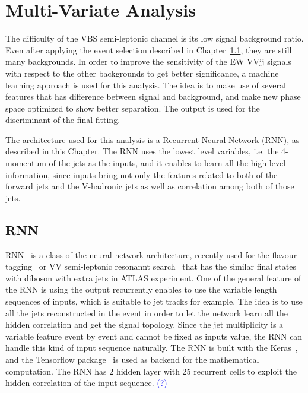 \chapter{Multi-Variate Analysis}

The difficulty of the VBS semi-leptonic channel is its low signal background ratio. Even after applying the event selection described in Chapter~\ref{}, they are still many backgrounds. In order to improve the sensitivity of the EW VVjj signals with respect to the other backgrounds to get better significance, a machine learning approach is used for this analysis.
The idea is to make use of several features that has difference between signal and background, and make new phase space optimized to show better separation. The output is used for the discriminant of the final fitting.

The architecture used for this analysis is a Recurrent Neural Network (RNN), as described in this Chapter.
The RNN uses the lowest level variables, i.e. the 4-momentum of the jets as the inputs, and it enables to learn all the high-level information, since inputs bring not only the features related to both of the forward jets and the V-hadronic jets as well as correlation among both of those jets.

\section{RNN}
RNN~\cite{Sherstinsky_2020} is a class of the neural network architecture, recently used for the flavour tagging~\cite{ATL-PHYS-PUB-2017-003} or VV semi-leptonic resonannt search~\cite{HDBS-2018-10} that has the similar final states with diboson  with extra jets in ATLAS experiment.
One of the general feature of the RNN is using the output recurrently enables to use the variable length sequences of inputs, which is suitable to jet tracks for example.
The idea is to use all the jets reconstructed in the event in order to let the network learn all the hidden correlation and get the signal topology.
Since the jet multiplicity is a variable feature event by event and cannot be fixed as inputs value, the RNN can handle this kind of input sequence naturally.
The RNN is built with the Keras~\cite{chollet2015keras}, and the Tensorflow package~\cite{tensorflow2015-whitepaper} is used as backend for the mathematical computation. The RNN has 2 hidden layer with 25 recurrent cells to exploit the hidden correlation of the input sequence. \textcolor{blue}{(?)}

